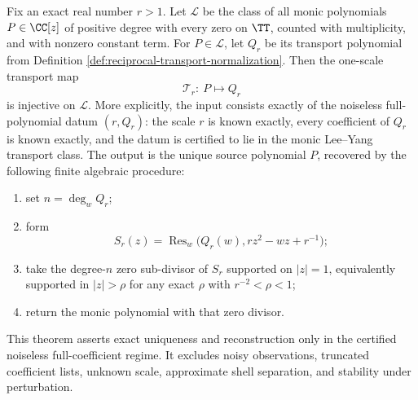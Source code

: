 \begin{theorem}\label{thm:leyang-single-scale-reconstruction}
Fix an exact real number \(r>1\).  Let \(\mathcal L\) be the class of all monic polynomials \(P\in\CC[z]\) of positive degree with every zero on \(\TT\), counted with multiplicity, and with nonzero constant term.  For \(P\in\mathcal L\), let \(Q_r\) be its transport polynomial from Definition \ref{def:reciprocal-transport-normalization}.  Then the one-scale transport map
\[
\mathcal T_r:\ P\longmapsto Q_r
\]
is injective on \(\mathcal L\).  More explicitly, the input consists exactly of the noiseless full-polynomial datum \((r,Q_r)\): the scale \(r\) is known exactly, every coefficient of \(Q_r\) is known exactly, and the datum is certified to lie in the monic Lee--Yang transport class.  The output is the unique source polynomial \(P\), recovered by the following finite algebraic procedure:
\begin{enumerate}[label=\textup{(\roman*)}]
  \item set \(n=\deg_w Q_r\);
  \item form
  \[
  S_r(z)=\operatorname{Res}_w\!\bigl(Q_r(w),rz^2-wz+r^{-1}\bigr);
  \]
  \item take the degree-\(n\) zero sub-divisor of \(S_r\) supported on \(|z|=1\), equivalently supported in \(|z|>\rho\) for any exact \(\rho\) with \(r^{-2}<\rho<1\);
  \item return the monic polynomial with that zero divisor.
\end{enumerate}
This theorem asserts exact uniqueness and reconstruction only in the certified noiseless full-coefficient regime.  It excludes noisy observations, truncated coefficient lists, unknown scale, approximate shell separation, and stability under perturbation.
\end{theorem}

